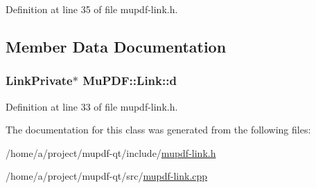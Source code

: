 Definition at line 35 of file mupdf-\/link.\-h.



\subsection{Member Data Documentation}
\hypertarget{class_mu_p_d_f_1_1_link_a5723c1b46286b89fd7a8fccfa3dc05d2}{
\subsubsection[{d}]{\setlength{\rightskip}{0pt plus 5cm}Link\-Private$\ast$ Mu\-P\-D\-F\-::\-Link\-::d\hspace{0.3cm}{\ttfamily [protected]}}}\label{class_mu_p_d_f_1_1_link_a5723c1b46286b89fd7a8fccfa3dc05d2}


Definition at line 33 of file mupdf-\/link.\-h.



The documentation for this class was generated from the following files\-:\begin{DoxyCompactItemize}
\item 
/home/a/project/mupdf-\/qt/include/\hyperlink{mupdf-link_8h}{mupdf-\/link.\-h}\item 
/home/a/project/mupdf-\/qt/src/\hyperlink{mupdf-link_8cpp}{mupdf-\/link.\-cpp}\end{DoxyCompactItemize}
